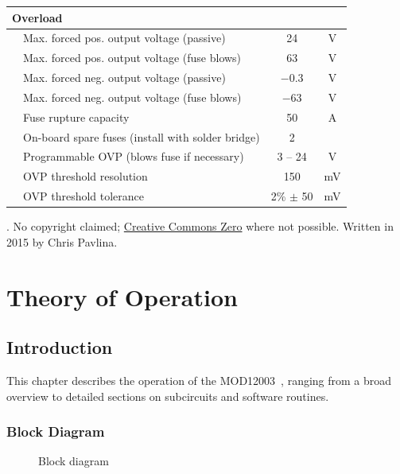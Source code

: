 \documentclass[letterpaper,twocolumn,10pt,openany,oneside,final,fleqn]{memoir}
\newcommand{\Neg}[1]{{\ensuremath{-}#1}}
\newcommand{\Model}{MOD12003\ }
\newcommand{\xcircuit}[1]{ \centering \textsf{  } }
\begin{document}
\begin{titlingpage}
\begin{table}[h]
\begin{tabular}{p{2mm}lcc}
    \midrule
    \multicolumn{2}{l}{\textbf{Overload}} & & \\ \midrule
    & Max. forced pos. output voltage (passive) & 24 & V \\
    & Max. forced pos. output voltage (fuse blows) & 63 & V \\
    & Max. forced neg. output voltage (passive) & \Neg{0.3} & V \\
    & Max. forced neg. output voltage (fuse blows) & \Neg{63} & V \\
    & Fuse rupture capacity & 50 & A \\
    & On-board spare fuses (install with solder bridge) & 2 & \\
    & Programmable OVP (blows fuse if necessary) & 3 -- 24 & V \\
    & OVP threshold resolution & 150 & mV \\
    & OVP threshold tolerance  & 2\% $\pm$ 50 & mV \\
    \bottomrule
\end{tabular}
\end{table}
\vfill
\begin{center}
    \ccZero. No copyright claimed;
    \href{https://creativecommons.org/publicdomain/zero/1.0/}{Creative Commons Zero} where not possible.
    Written in 2015 by Chris Pavlina.
\end{center}
\end{titlingpage}

\clearpage
\twocolumn[
    \tableofcontents
]
\twocolumn[
    \listoffigures*
    \listoftables*
]

\mainmatter

\chapter{Theory of Operation}
\label{chap:too}

\section{Introduction}

This chapter describes the operation of the \Model, ranging from a broad overview
to detailed sections on subcircuits and software routines.

\subsection{Block Diagram}

\begin{figure}
\xcircuit{BlockDiagram}
\caption{Block diagram}\label{fig:blockdiagram}
\end{figure}
\end{document}
